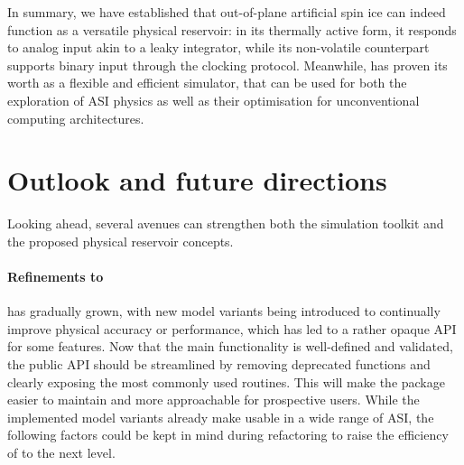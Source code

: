 In summary, we have established that out-of-plane artificial spin ice can indeed function as a versatile physical reservoir: in its thermally active form, it responds to analog input akin to a leaky integrator, while its non-volatile counterpart supports binary input through the clocking protocol. %
Meanwhile, \hotspice has proven its worth as a flexible and efficient simulator, that can be used for both the exploration of ASI physics as well as their optimisation for unconventional computing architectures.

\newpage
\section{Outlook and future directions}
Looking ahead, several avenues can strengthen both the \hotspice simulation toolkit and the proposed physical reservoir concepts.

\paragraph{Refinements to \hotspice}
\hotspice has gradually grown, with new model variants being introduced to continually improve physical accuracy or performance, which has led to a rather opaque API for some features.
Now that the main functionality is well-defined and validated, the public API should be streamlined by removing deprecated functions and clearly exposing the most commonly used routines. %
This will make the package easier to maintain and more approachable for prospective users.
While the implemented model variants already make \hotspice usable in a wide range of ASI, the following factors could be kept in mind during refactoring to raise the efficiency of \hotspice to the next level. \\\par

